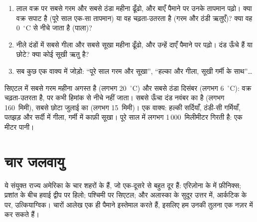 \begin{method}[जलवायु आलेख पढ़ना]\label{met:g5:weather-and-climate:reading}
\begin{enumerate}
  \item लाल वक्र पर सबसे गरम और सबसे ठंडा महीना ढूँढो, और बाएँ पैमाने पर उनके
        तापमान पढ़ो। क्या वक्र सपाट है (पूरे साल एक-सा तापमान) या वह चढ़ता-उतरता
        है (गरम और ठंडी ऋतुएँ)? क्या वह 0~$^\circ$C से नीचे जाता है
        (पाला)?
  \item नीले दंडों में सबसे गीला और सबसे सूखा महीना ढूँढो, और उन्हें दाएँ पैमाने पर
        पढ़ो। दंड ऊँचे हैं या छोटे? क्या कोई सूखी
        ऋतु है?
  \item सब कुछ एक वाक्य में जोड़ो: ``पूरे साल गरम और सूखा'', ``हल्का
        और गीला, सूखी गर्मी के साथ''{\ldots}
\end{enumerate}
\end{method}

\begin{example}[सिएटल]\label{ex:g5:weather-and-climate:seattle}
सिएटल में सबसे गरम महीना अगस्त है (लगभग 20~$^\circ$C) और सबसे ठंडा दिसंबर
(लगभग 6~$^\circ$C): वक्र चढ़ता-उतरता है, पर कभी हिमांक से नीचे नहीं जाता।
सबसे ऊँचा दंड नवंबर का है (लगभग 160~मिमी), सबसे छोटा जुलाई का (लगभग 15~मिमी)।
एक वाक्य: हल्की सर्दियाँ, ठंडी-सी गर्मियाँ, पतझड़ और सर्दी में गीला, गर्मी में
काफ़ी सूखा। पूरे साल में लगभग 1\,000~मिलीमीटर  गिरती है: एक मीटर
पानी।
\end{example}

\section{चार जलवायु}

ये संयुक्त राज्य अमेरिका के चार शहरों के  हैं, जो एक-दूसरे से बहुत दूर
हैं: एरिज़ोना के  में फ़ीनिक्स; प्रशांत  के बीच हवाई द्वीप पर हिलो;
पश्चिमी  पर सिएटल; और अलास्का के सुदूर उत्तर में, आर्कटिक  के  पर,
उत्कियाग्विक। चारों आलेख एक ही पैमाने इस्तेमाल करते हैं, इसलिए हम उनकी तुलना
एक नज़र में कर सकते हैं।

